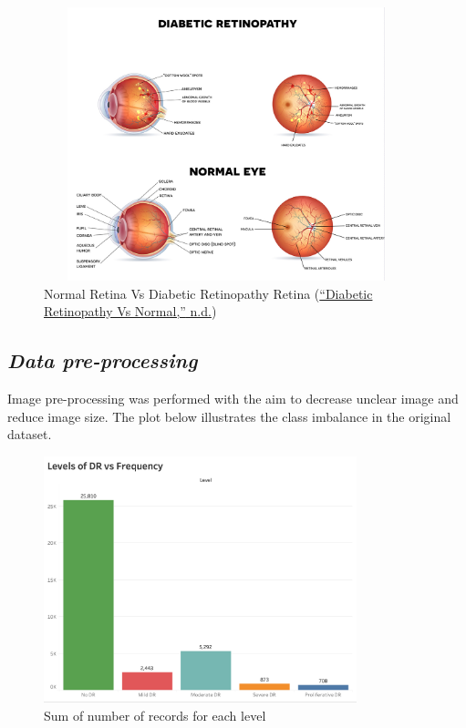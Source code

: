 \documentclass[
]{article}
\begin{document}
\begin{figure}
\centering
\includegraphics[width=4.16667in,height=3.125in]{images/image 1.jpg}
\caption{Normal Retina Vs Diabetic Retinopathy Retina
(\protect\hyperlink{ref-diabetica}{{``Diabetic Retinopathy Vs Normal,''}
n.d.})}
\end{figure}

\hypertarget{data-pre-processing}{%
\subsection{\texorpdfstring{\emph{Data
pre-processing}}{Data pre-processing}}\label{data-pre-processing}}

Image pre-processing was performed with the aim to decrease unclear
image and reduce image size. The plot below illustrates the class
imbalance in the original dataset.

\begin{figure}
\centering
\includegraphics[width=3.57292in,height=\textheight]{images/LevelsOfDR.png}
\caption{Sum of number of records for each level}
\end{figure}
\end{document}
